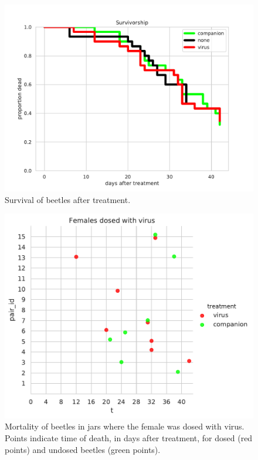 \documentclass[11pt,letterpaper]{scrartcl}
\begin{document}
\begin{figure}[h]
\centering
\includegraphics[width=\textwidth]{survivorship.pdf}
\caption{Survival of beetles after treatment.}
\label{fig:survivorship}
\end{figure}

\begin{figure}[h]
\centering
\includegraphics[width=\textwidth]{tf.pdf}
\caption{Mortality of beetles in jars where the female was dosed with virus. Points indicate time of death, in days after treatment, for dosed (red points) and undosed beetles (green points).}
\label{fig:tf}
\end{figure}
\end{document}
